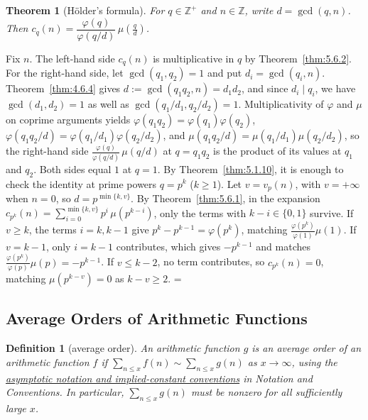 \documentclass[11pt]{article}
\makeatletter
\let\nt@closedisplay\]
\def\nt@guardedclose{\@ifnextchar\par{\nt@closeafterpar}{\@ifnextchar\end{\postdisplaypenalty\@M\nt@closedisplay}{\nt@closedisplay}}}
\def\nt@closeafterpar\par{\@ifnextchar\par{\nt@closeafterpar}{\@ifnextchar\end{\postdisplaypenalty\@M\nt@closedisplay\par}{\nt@closedisplay\par}}}
\renewenvironment{proof}[1][\proofname]{\par
  \pushQED{\qed}\normalfont\topsep\medskipamount\edef\nt@afterproof{\@endparpenalty=\the\@endparpenalty\relax}\@beginparpenalty\@M\@endparpenalty\@M\let\]\nt@guardedclose\trivlist\item[]\textit{#1\@addpunct{.}} \ignorespaces}{\ifvmode\addpenalty\@M\fi\popQED\nt@afterproof\endtrivlist\@endpefalse}
\theoremstyle{ntstyle}
\newtheorem{theorem}{Theorem}[subsection]
\newtheorem{definition}{Definition}[subsection]
\makeatother
\begin{document}
\begin{theorem}[Hölder's formula]\label{thm:5.6.3}\label{thm:holder-formula}
  For $q\in\mathbb{Z}^+$ and $n\in\mathbb{Z}$, write $d = \gcd(q, n)$. Then
  $c_q(n) = \dfrac{\varphi(q)}{\varphi(q/d)}\, \mu\!\left(\tfrac{q}{d}\right)$.

\end{theorem}

\begin{proof}
  Fix $n$. The left-hand side $c_q(n)$ is multiplicative in $q$ by Theorem~\ref{thm:5.6.2}. For the right-hand
  side, let $\gcd(q_1, q_2) = 1$ and put $d_i = \gcd(q_i, n)$. Theorem~\ref{thm:4.6.4} gives
  $d := \gcd(q_1 q_2, n) = d_1 d_2$, and since $d_i \mid q_i$, we have $\gcd(d_1, d_2) = 1$ as well as
  $\gcd(q_1/d_1, q_2/d_2) = 1$. Multiplicativity of $\varphi$ and $\mu$ on coprime arguments yields
  $\varphi(q_1 q_2) = \varphi(q_1)\varphi(q_2)$, $\varphi(q_1 q_2/d) = \varphi(q_1/d_1)\varphi(q_2/d_2)$, and
  $\mu(q_1 q_2/d) = \mu(q_1/d_1)\mu(q_2/d_2)$, so the right-hand side $\tfrac{\varphi(q)}{\varphi(q/d)}\,\mu(q/d)$
  at $q = q_1 q_2$ is the product of its values at $q_1$ and $q_2$. Both sides equal
  $1$ at $q = 1$. By Theorem~\ref{thm:5.1.10}, it is enough to
  check the identity at prime powers $q = p^{k}$ ($k \ge 1$). Let $v=v_p(n)$, with $v=+\infty$ when $n=0$, so
  $d=p^{\min\{k,v\}}$. By Theorem~\ref{thm:5.6.1}, in the expansion
  $c_{p^{k}}(n) = \sum_{i=0}^{\min\{k, v\}} p^{i}\, \mu(p^{k-i})$, only the terms with $k - i \in \{0,1\}$ survive.
  If $v \ge k$,
  the terms $i = k, k-1$ give $p^{k} - p^{k-1} = \varphi(p^{k})$,
  matching $\tfrac{\varphi(p^{k})}{\varphi(1)}\mu(1)$. If $v = k-1$,
  only $i = k-1$ contributes, which gives $-p^{k-1}$ and matches
  $\tfrac{\varphi(p^{k})}{\varphi(p)}\mu(p) = -p^{k-1}$. If $v \le k-2$,
  no term contributes, so $c_{p^{k}}(n) = 0$, matching $\mu(p^{k-v}) = 0$
  as $k - v \ge 2$.
\end{proof}
\subsection{Average Orders of Arithmetic Functions}

\begin{definition}[average order]\label{def:5.7.1}\label{def:average-order} An arithmetic
  function $g$ is an average order of an arithmetic function $f$ if
  $\sum_{n\le x}f(n)\sim\sum_{n\le x}g(n)$ as $x\to\infty$,
  using the \hyperref[sec:asymptotic-notation]{asymptotic notation and implied-constant conventions}
  in Notation and Conventions. In particular, $\sum_{n\le x}g(n)$ must be nonzero
  for all sufficiently large $x$.

\end{definition}
\end{document}
